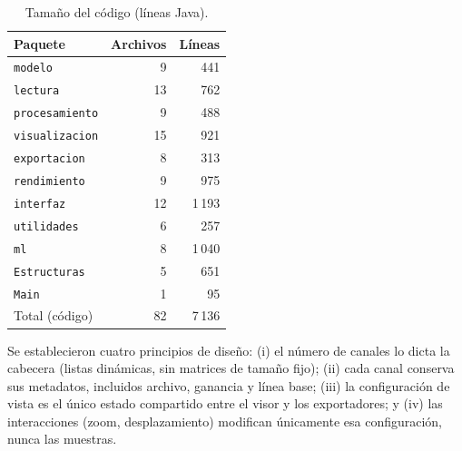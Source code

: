 \begin{table}[H]
\centering\small
\caption{Tamaño del código (líneas Java).}
\label{tab:codigo}
\begin{tabular}{@{}lrr@{}}
\toprule
Paquete & Archivos & Líneas \\
\midrule
\texttt{modelo}        & 9  & 441 \\
\texttt{lectura}       & 13 & 762 \\
\texttt{procesamiento} & 9  & 488 \\
\texttt{visualizacion} & 15 & 921 \\
\texttt{exportacion}   & 8  & 313 \\
\texttt{rendimiento}   & 9  & 975 \\
\texttt{interfaz}      & 12 & 1\,193 \\
\texttt{utilidades}    & 6  & 257 \\
\texttt{ml}   & 8  & 1\,040 \\
\texttt{Estructuras}   & 5  & 651 \\
\texttt{Main}          & 1  & 95 \\
\midrule
Total (código)         & 82 & 7\,136 \\
\bottomrule
\end{tabular}
\end{table}

Se establecieron cuatro principios de diseño: (i) el número de canales lo dicta la cabecera (listas dinámicas, sin matrices de tamaño fijo); (ii) cada canal conserva sus metadatos, incluidos archivo, ganancia y línea base; (iii) la configuración de vista es el único estado compartido entre el visor y los exportadores; y (iv) las interacciones (zoom, desplazamiento) modifican únicamente esa configuración, nunca las muestras.
